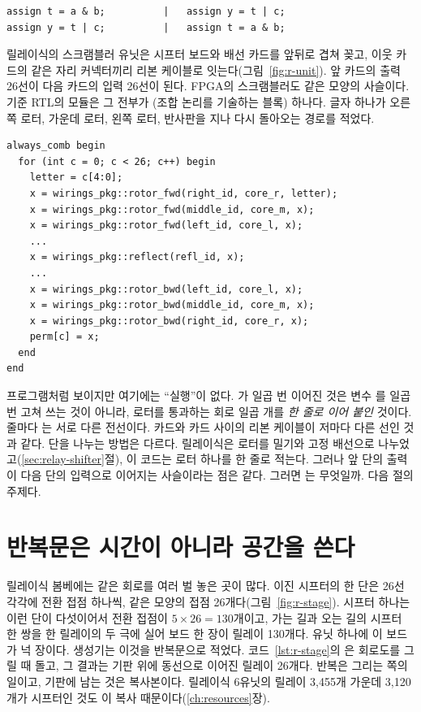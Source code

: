 \begin{lstlisting}[language=SV,numbers=none]
assign t = a & b;          |   assign y = t | c;
assign y = t | c;          |   assign t = a & b;
\end{lstlisting}

\Ours 릴레이식의 스크램블러 유닛은 시프터 보드와 배선 카드를 앞뒤로 겹쳐 꽂고, 이웃 카드의 같은 자리
커넥터끼리 리본 케이블로 잇는다(그림~\ref{fig:r-unit}). 앞 카드의 출력 26선이 다음 카드의 입력 26선이 된다.
FPGA의 스크램블러도 같은 모양의 사슬이다. 기준 RTL의  모듈은 그 전부가
(조합 논리를 기술하는 블록) 하나다. 글자 하나가 오른쪽 로터, 가운데 로터, 왼쪽 로터,
반사판을 지나 다시 돌아오는 경로를 적었다.

\begin{lstlisting}[language=SV,caption={\code{rtl/src/scrambler.sv}의 본체(그리스 로터 부분 생략).},label={lst:g-scr}]
always_comb begin
  for (int c = 0; c < 26; c++) begin
    letter = c[4:0];
    x = wirings_pkg::rotor_fwd(right_id, core_r, letter);
    x = wirings_pkg::rotor_fwd(middle_id, core_m, x);
    x = wirings_pkg::rotor_fwd(left_id, core_l, x);
    ...
    x = wirings_pkg::reflect(refl_id, x);
    ...
    x = wirings_pkg::rotor_bwd(left_id, core_l, x);
    x = wirings_pkg::rotor_bwd(middle_id, core_m, x);
    x = wirings_pkg::rotor_bwd(right_id, core_r, x);
    perm[c] = x;
  end
end
\end{lstlisting}

프로그램처럼 보이지만 여기에는 ``실행''이 없다. 가 일곱 번 이어진 것은 변수 를 일곱
번 고쳐 쓰는 것이 아니라, 로터를 통과하는 회로 일곱 개를 \emph{한 줄로 이어 붙인} 것이다. 줄마다
는 서로 다른 전선이다. 카드와 카드 사이의 리본 케이블이 저마다 다른 선인 것과 같다. 단을 나누는 방법은
다르다. 릴레이식은 로터를 밀기와 고정 배선으로 나누었고(\ref{sec:relay-shifter}절), 이 코드는 로터 하나를 한
줄로 적는다. 그러나 앞 단의 출력이 다음 단의 입력으로 이어지는 사슬이라는 점은 같다. 그러면 는
무엇일까. 다음 절의 주제다.

\section{반복문은 시간이 아니라 공간을 쓴다}

\Relay 릴레이식 봄베에는 같은 회로를 여러 벌 놓은 곳이 많다. 이진 시프터의 한 단은 26선 각각에 전환 접점 하나씩,
같은 모양의 접점 26개다(그림~\ref{fig:r-stage}). 시프터 하나는 이런 단이 다섯이어서 전환 접점이
$5 \times 26 = 130$개이고, 가는 길과 오는 길의 시프터 한 쌍을 한 릴레이의 두 극에 실어 보드 한 장이 릴레이 130개다.
유닛 하나에 이 보드가 넉 장이다. 생성기는 이것을 반복문으로 적었다. 코드~\ref{lst:r-stage}의
은 회로도를 그릴 때 돌고, 그 결과는 기판 위에 동선으로 이어진 릴레이 26개다. 반복은 그리는
쪽의 일이고, 기판에 남는 것은 복사본이다. 릴레이식 6유닛의 릴레이 3,455개 가운데 3,120개가 시프터인 것도
이 복사 때문이다(\ref{ch:resources}장).

